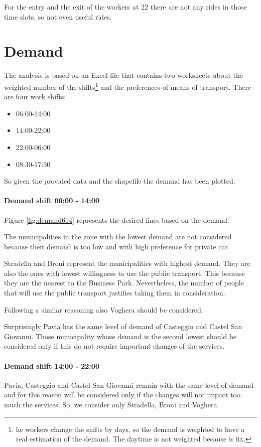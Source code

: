 For the entry and the exit of the workers at 22 there are not any rides in those time slots, so not even useful rides.
\newpage

\newpage
\section{Demand}

The analysis is based on an Excel file that contains two worksheets about the weighted number of the shifts\footnote{he workers change the shifts by days, so the demand is weighted to have a real estimation of the demand. The daytime is not weighted because is fix.}  and the preferences of means of transport.
There are four work shifts:

\begin{itemize}
    \item 06:00-14:00
    \item 14:00-22:00
    \item 22:00-06:00
    \item 08:30-17:30
\end{itemize}
So given the provided data and the shapefile \cite{Istat2022CONFINI2022} the demand has been plotted.

\paragraph{Demand shift 06:00 - 14:00}

Figure \ref{fig:demand614} represents the desired lines based on the demand.

The municipalities in the zone with the lowest demand are not considered because their demand is too low and with high preference for private car.

Stradella and Broni represent the municipalities with highest demand. They are also the ones with lowest willingness to use the public transport. This because they are the nearest to the Business Park. Nevertheless, the number of people that will use the public transport justifies taking them in consideration. 

Following a similar reasoning also Voghera should be considered.

Surprisingly Pavia has the same level of demand of Casteggio and Castel San Giovanni. Those municipality whose demand is the second lowest should be considered only if this do not require important changes of the services.

\paragraph{Demand shift 14:00 - 22:00}
Pavia, Casteggio and Castel San Giovanni remain with the same level of demand and for this reason will be considered only if the changes will not impact too much the services.
So, we consider only Stradella, Broni and Voghera. 

